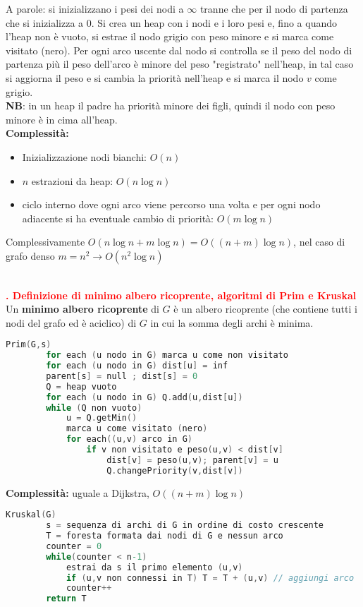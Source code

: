 \documentclass[12pt]{article}
\newcounter{questioncounter}
\newcommand{\question}[1]{
    \stepcounter{questioncounter}
    \textbf{\\\textcolor{red}{\arabic{questioncounter}. #1}}\\
}
\begin{document}
A parole: si inizializzano i pesi dei nodi a $\infty$ tranne che per il nodo di partenza che si inizializza a 0. Si crea un heap con i nodi e i loro pesi e, fino a quando l'heap non è vuoto, si estrae il nodo grigio con peso minore e si marca come visitato (nero). Per ogni arco uscente dal nodo si controlla se il peso del nodo di partenza più il peso dell'arco è minore del peso "registrato" nell'heap, in tal caso si aggiorna il peso e si cambia la priorità nell'heap e si marca il nodo $v$ come grigio.\\
\textbf{NB}: in un heap il padre ha priorità minore dei figli, quindi il nodo con peso minore è in cima all'heap.\\
\textbf{Complessità:}
\begin{itemize}
    \item Inizializzazione nodi bianchi: $O(n)$
    \item $n$ estrazioni da heap: $O(n \log n)$
    \item ciclo interno dove ogni arco viene percorso una volta e per ogni nodo adiacente si ha eventuale cambio di priorità: $O(m\log n)$
\end{itemize}
Complessivamente $O(n \log n + m \log n)=O((n+m)\log n)$, nel caso di grafo denso $m=n^{2} \rightarrow O(n^{2}\log n)$
\question{Definizione di minimo albero ricoprente, algoritmi di Prim e Kruskal}
Un \textbf{minimo albero ricoprente} di $G$ è un albero ricoprente (che contiene tutti i nodi del grafo ed è aciclico) di $G$ in cui la somma degli archi è minima.
\begin{lstlisting}[language=C]
    Prim(G,s)
        for each (u nodo in G) marca u come non visitato
        for each (u nodo in G) dist[u] = inf
        parent[s] = null ; dist[s] = 0
        Q = heap vuoto
        for each (u nodo in G) Q.add(u,dist[u])
        while (Q non vuoto)
            u = Q.getMin()
            marca u come visitato (nero)
            for each((u,v) arco in G)
                if v non visitato e peso(u,v) < dist[v]
                    dist[v] = peso(u,v); parent[v] = u
                    Q.changePriority(v,dist[v])
\end{lstlisting}
\textbf{Complessità:} uguale a Dijkstra, $O((n+m)\log n)$
\begin{lstlisting}[language=C]
    Kruskal(G)
        s = sequenza di archi di G in ordine di costo crescente
        T = foresta formata dai nodi di G e nessun arco
        counter = 0
        while(counter < n-1)
            estrai da s il primo elemento (u,v)
            if (u,v non connessi in T) T = T + (u,v) // aggiungi arco
            counter++
        return T
\end{lstlisting}
\end{document}
